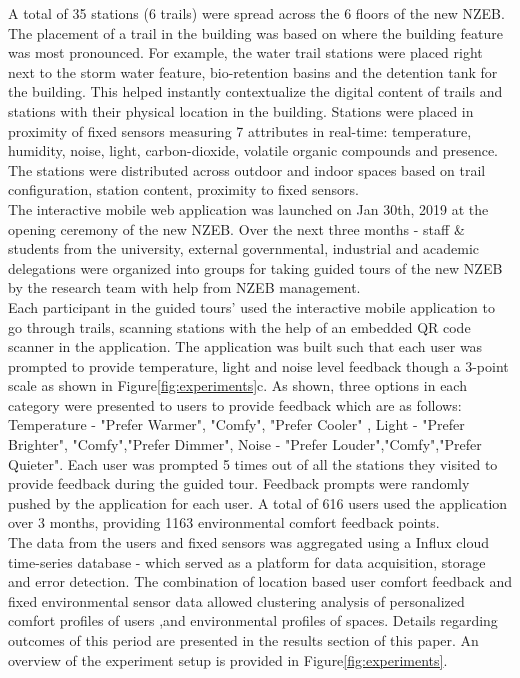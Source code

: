 

A total of 35 stations (6 trails) were spread across the 6 floors of the new NZEB. The placement of a trail in the building was based on where the building feature was most pronounced. For example, the water trail stations were placed right next to the storm water feature, bio-retention basins and the detention tank for the building. This helped instantly contextualize the digital content of trails and stations with their physical location in the building.
Stations were placed in proximity of fixed sensors measuring 7 attributes in real-time: temperature, humidity, noise, light, carbon-dioxide, volatile organic compounds and presence. The stations were distributed across outdoor and indoor spaces based on trail configuration, station content, proximity to fixed sensors.\\

The interactive mobile web application was launched on Jan 30th, 2019 at the opening ceremony of the new NZEB. Over the next three months - staff \& students from the university, external governmental, industrial and academic delegations were organized into groups for taking guided tours of the new NZEB by the research team with help from NZEB management.\\

Each participant in the guided tours' used the interactive mobile application to go through trails, scanning stations with the help of an embedded QR code scanner in the application. The application was built such that each user was prompted to provide temperature, light and noise level feedback though a 3-point scale as shown in Figure\ref{fig:experiments}c. As shown, three options in each category were presented to users to provide feedback which are as follows: Temperature - "Prefer Warmer", "Comfy", "Prefer Cooler" , Light - "Prefer Brighter", "Comfy","Prefer Dimmer", Noise - "Prefer Louder","Comfy","Prefer Quieter".  
Each user was prompted 5 times out of all the stations they visited to provide feedback during the guided tour. Feedback prompts were randomly pushed by the application for each user. A total of 616 users used the application over 3 months, providing 1163 environmental comfort feedback points.\\

The data from the users and fixed sensors was aggregated using a Influx cloud time-series database - which served as a platform for data acquisition, storage and error detection. The combination of location based user comfort feedback and fixed environmental sensor data allowed clustering analysis of personalized comfort profiles of users ,and environmental profiles of spaces. Details regarding outcomes of this period are presented in the results section of this paper. An overview of the experiment setup is provided in Figure\ref{fig:experiments}.\\



